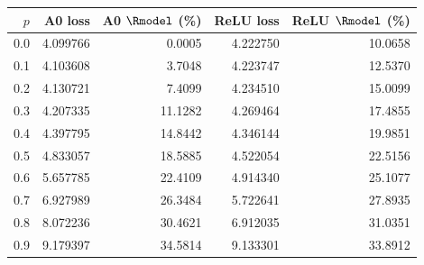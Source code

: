 \begin{tabular}{rrrrr}
\toprule
$p$ & A0 loss & A0 $\Rmodel$ (\%) & ReLU loss & ReLU $\Rmodel$ (\%) \\
\midrule
0.0 & 4.099766 & 0.0005 & 4.222750 & 10.0658 \\
0.1 & 4.103608 & 3.7048 & 4.223747 & 12.5370 \\
0.2 & 4.130721 & 7.4099 & 4.234510 & 15.0099 \\
0.3 & 4.207335 & 11.1282 & 4.269464 & 17.4855 \\
0.4 & 4.397795 & 14.8442 & 4.346144 & 19.9851 \\
0.5 & 4.833057 & 18.5885 & 4.522054 & 22.5156 \\
0.6 & 5.657785 & 22.4109 & 4.914340 & 25.1077 \\
0.7 & 6.927989 & 26.3484 & 5.722641 & 27.8935 \\
0.8 & 8.072236 & 30.4621 & 6.912035 & 31.0351 \\
0.9 & 9.179397 & 34.5814 & 9.133301 & 33.8912 \\
\bottomrule
\end{tabular}
